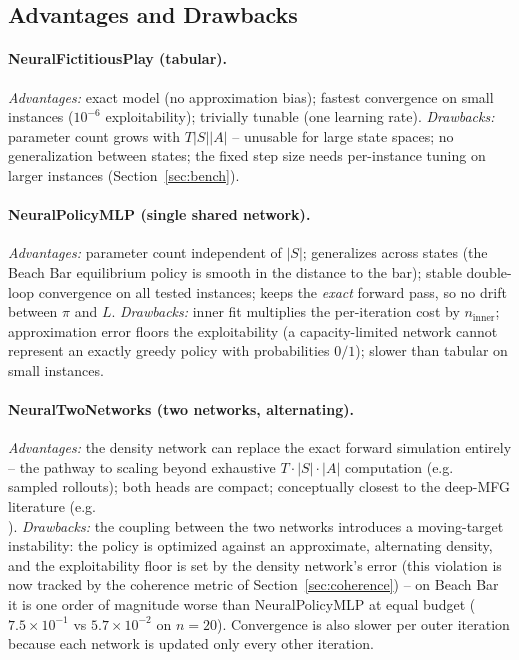 \documentclass[11pt,a4paper]{article}
\begin{document}
\subsection{Advantages and Drawbacks}

\paragraph{NeuralFictitiousPlay (tabular).}
\emph{Advantages:} exact model (no approximation bias); fastest convergence on
small instances ($10^{-6}$ exploitability); trivially tunable (one learning
rate). \emph{Drawbacks:} parameter count grows with $T |S| |A|$ -- unusable
for large state spaces; no generalization between states; the fixed step size
needs per-instance tuning on larger instances (Section~\ref{sec:bench}).

\paragraph{NeuralPolicyMLP (single shared network).}
\emph{Advantages:} parameter count independent of $|S|$; generalizes across
states (the Beach Bar equilibrium policy is smooth in the distance to the
bar); stable double-loop convergence on all tested instances; keeps the
\emph{exact} forward pass, so no drift between $\pi$ and $L$.
\emph{Drawbacks:} inner fit multiplies the per-iteration cost by
$n_{\mathrm{inner}}$; approximation error floors the exploitability (a
capacity-limited network cannot represent an exactly greedy policy with
probabilities $0/1$); slower than tabular on small instances.

\paragraph{NeuralTwoNetworks (two networks, alternating).}
\emph{Advantages:} the density network can replace the exact forward
simulation entirely -- the pathway to scaling beyond exhaustive
$T \cdot |S| \cdot |A|$ computation (e.g.\\ sampled rollouts); both heads are
compact; conceptually closest to the deep-MFG literature (e.g.\\
\cite{mao2022}). \emph{Drawbacks:} the coupling between the two networks
introduces a moving-target instability: the policy is optimized against an
approximate, alternating density, and the exploitability floor is set by the
density network's error (this violation is now tracked by the coherence
metric of Section~\ref{sec:coherence}) -- on Beach Bar it is one order of magnitude worse
than NeuralPolicyMLP at equal budget ($7.5 \times 10^{-1}$ vs
$5.7 \times 10^{-2}$ on $n{=}20$). Convergence is also slower per outer
iteration because each network is updated only every other iteration.
\end{document}

